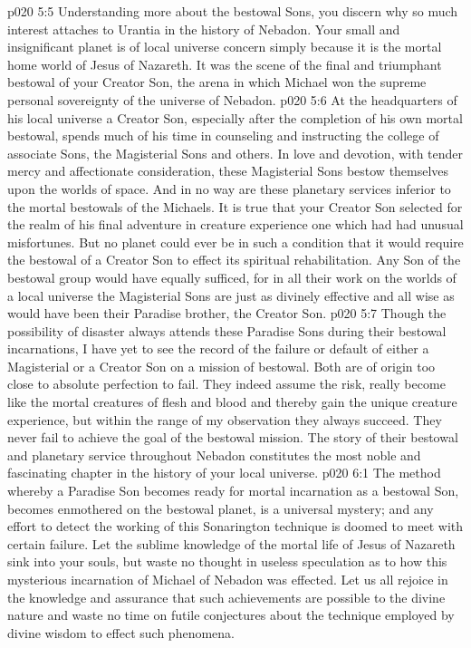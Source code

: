 \pc \vs p020 5:5 Understanding more about the bestowal Sons, you discern why so much interest attaches to Urantia in the history of Nebadon. Your small and insignificant planet is of local universe concern simply because it is the mortal home world of Jesus of Nazareth. It was the scene of the final and triumphant bestowal of your Creator Son, the arena in which Michael won the supreme personal sovereignty of the universe of Nebadon.
\vs p020 5:6 At the headquarters of his local universe a Creator Son, especially after the completion of his own mortal bestowal, spends much of his time in counseling and instructing the college of associate Sons, the Magisterial Sons and others. In love and devotion, with tender mercy and affectionate consideration, these Magisterial Sons bestow themselves upon the worlds of space. And in no way are these planetary services inferior to the mortal bestowals of the Michaels. It is true that your Creator Son selected for the realm of his final adventure in creature experience one which had had unusual misfortunes. But no planet could ever be in such a condition that it would require the bestowal of a Creator Son to effect its spiritual rehabilitation. Any Son of the bestowal group would have equally sufficed, for in all their work on the worlds of a local universe the Magisterial Sons are just as divinely effective and all wise as would have been their Paradise brother, the Creator Son.
\pc \vs p020 5:7 Though the possibility of disaster always attends these Paradise Sons during their bestowal incarnations, I have yet to see the record of the failure or default of either a Magisterial or a Creator Son on a mission of bestowal. Both are of origin too close to absolute perfection to fail. They indeed assume the risk, really become like the mortal creatures of flesh and blood and thereby gain the unique creature experience, but within the range of my observation they always succeed. They never fail to achieve the goal of the bestowal mission. The story of their bestowal and planetary service throughout Nebadon constitutes the most noble and fascinating chapter in the history of your local universe.
\vs p020 6:1 The method whereby a Paradise Son becomes ready for mortal incarnation as a bestowal Son, becomes enmothered on the bestowal planet, is a universal mystery; and any effort to detect the working of this Sonarington technique is doomed to meet with certain failure. Let the sublime knowledge of the mortal life of Jesus of Nazareth sink into your souls, but waste no thought in useless speculation as to how this mysterious incarnation of Michael of Nebadon was effected. Let us all rejoice in the knowledge and assurance that such achievements are possible to the divine nature and waste no time on futile conjectures about the technique employed by divine wisdom to effect such phenomena.
